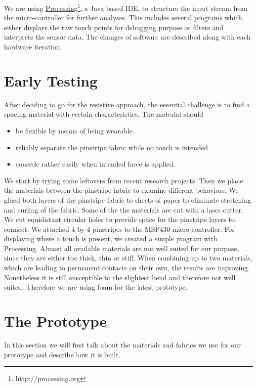 We are using \href{http://processing.org}{Processing}\footnote{http://processing.org}, a Java based IDE, to structure the input stream from the micro-controller for further analyses. This includes several programs which either displays the raw touch points for debugging purpose or filters and interprets the sensor data. The changes of software are described along with each hardware iteration. 

\section{Early Testing}
After deciding to go for the resistive approach, the essential challenge is to find a spacing material with certain characteristics. The material should
\begin{itemize}
\item be flexible by means of being wearable.
\item reliably separate the pinstripe fabric while no touch is intended.
\item concede rather easily when intended force is applied.
\end{itemize}
We start by trying some leftovers from recent research projects. 
Then we place the materials between the pinstripe fabric to examine different behaviors. We glued both layers of the pinstripe fabric to sheets of paper to eliminate stretching and curling of the fabric. Some of the the materials are cut with a laser cutter. We cut equidistant circular holes to provide space for the pinstripe layers to connect. We attached 4 by 4 pinstripes to the MSP430 micro-controller. For displaying where a touch is present, we created a simple program with Processing.
Almost all available materials are not well suited for our purpose, since they are either too thick, thin or stiff. When combining up to two materials, which are leading to permanent contacts on their own, the results are improving. Nonetheless it is still susceptible to the slightest bend and therefore not well suited. Therefore we are using foam for the latest prototype. 

\section{The Prototype}
In this section we will first talk about the materials and fabrics we use for our prototype and describe how it is built.

